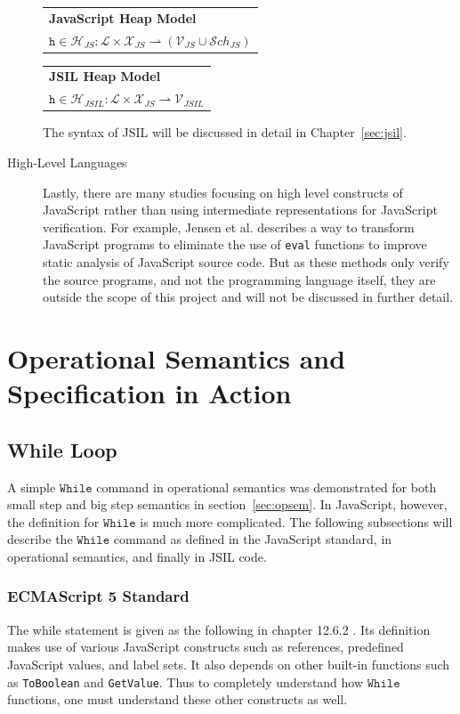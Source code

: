 \documentclass[a4paper,11pt,twoside]{report}
\begin{document}
\begin{description}
\begin{center}
\begin{tabular}{p{9cm}} \hline
\textbf{JavaScript Heap Model} \\
$\texttt{h} \in \mathcal{H}_{JS} : \mathcal{L} \times \mathcal{X}_{JS} \rightharpoonup (\mathcal{V}_{JS} \cup \mathcal{S}ch_{JS})$  \\ \hline
\end{tabular}

\begin{tabular}{p{9cm}} \hline
\textbf{JSIL Heap Model} \\
$\texttt{h} \in \mathcal{H}_{JSIL} : \mathcal{L} \times \mathcal{X}_{JS} \rightharpoonup \mathcal{V}_{JSIL} $  \\ \hline
\end{tabular}
\end{center}

The syntax of JSIL will be discussed in detail in Chapter~\ref{sec:jsil}.

\item[High-Level Languages] Lastly, there are many studies focusing on high level constructs of JavaScript rather than using intermediate representations for JavaScript verification. For example, Jensen et al. \cite{unevalizer2012} describes a way to transform JavaScript programs to eliminate the use of \texttt{eval} functions to improve static analysis of JavaScript source code. But as these methods only verify the source programs, and not the programming language itself, they are outside the scope of this project and will not be discussed in further detail.
\end{description}

\section{Operational Semantics and Specification in Action}
\subsection{While Loop}
A simple $\mathtt{While}$ command in operational semantics was demonstrated for both small step and big step semantics in section~\ref{sec:opsem}. In JavaScript, however, the definition for $\mathtt{While}$ is much more complicated. The following subsections will describe the $\mathtt{While}$ command as defined in the JavaScript standard, in operational semantics, and finally in JSIL code.

\subsubsection{ECMAScript 5 Standard} 
The while statement is given as the following in chapter 12.6.2 \cite{EcmaScript}. Its definition makes use of various JavaScript constructs such as references, predefined JavaScript values, and label sets. It also depends on other built-in functions such as \texttt{ToBoolean} and \texttt{GetValue}. Thus to completely understand how $\mathtt{While}$ functions, one must understand these other constructs as well.
\end{document}
